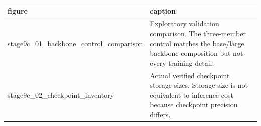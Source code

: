 \begin{tabular}{ll}
\toprule
figure & caption \\
\midrule
stage9c\_01\_backbone\_control\_comparison & Exploratory validation comparison. The three-member control matches the base/large backbone composition but not every training detail. \\
stage9c\_02\_checkpoint\_inventory & Actual verified checkpoint storage sizes. Storage size is not equivalent to inference cost because checkpoint precision differs. \\
\bottomrule
\end{tabular}
